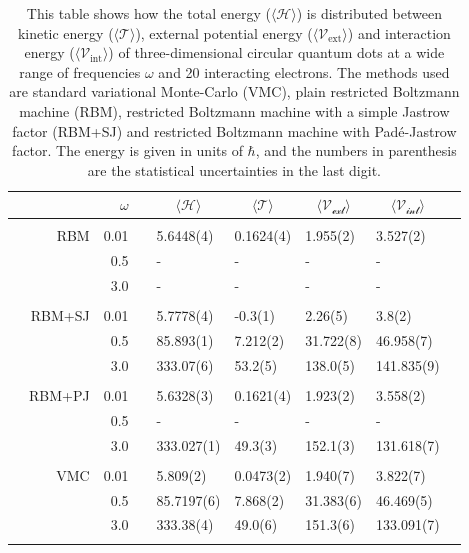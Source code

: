 \begin{table}
	\caption{This table shows how the total energy ($\langle\mathcal{H}\rangle$) is distributed between kinetic energy ($\langle\mathcal{T}\rangle$), external potential energy ($\langle\mathcal{V}_{\text{ext}}\rangle$) and interaction energy ($\langle\mathcal{V}_{\text{int}}\rangle$) of three-dimensional circular quantum dots at a wide range of frequencies $\omega$ and 20 interacting electrons. The methods used are standard variational Monte-Carlo (VMC), plain restricted Boltzmann machine (RBM), restricted Boltzmann machine with a simple Jastrow factor (RBM+SJ) and restricted Boltzmann machine with Padé-Jastrow factor. The energy is given in units of $\hbar$, and the numbers in parenthesis are the statistical uncertainties in the last digit.}
	\label{tab:splitfrequencyQD3D20P}
	\begin{tabularx}{\textwidth}{R{1cm}rrcR{2.3cm}R{2.3cm}R{2.3cm}R{2.3cm}R{0.3cm}} \hline\hline
		&\makecell{\\ \phantom{$N$} \\ \phantom{=}} & $\omega$ &&  &  &  &  \\ \hline \\
		&RBM & 0.01 && 5.6448(4) & 0.1624(4) & 1.955(2) & 3.527(2) \\
		&& 0.5 && - & - & - & - \\
		&& 3.0 && - & - & - & - \\ \hdashline \\
		
		&RBM+SJ & 0.01 && 5.7778(4) & -0.3(1) & 2.26(5) & 3.8(2) \\
		&& 0.5 && 85.893(1) & 7.212(2) & 31.722(8) & 46.958(7) \\
		&& 3.0 && 333.07(6) & 53.2(5) & 138.0(5) & 141.835(9) \\ \hdashline \\
		
		&RBM+PJ & 0.01 && 5.6328(3) & 0.1621(4) & 1.923(2) & 3.558(2) \\
		&& 0.5 && - & - & - & - \\
		&& 3.0 && 333.027(1) & 49.3(3) & 152.1(3) & 131.618(7) \\ \hdashline \\
		
		&VMC & 0.01 && 5.809(2) & 0.0473(2) & 1.940(7) & 3.822(7) \\
		&& 0.5 && 85.7197(6) & 7.868(2) & 31.383(6) & 46.469(5) \\
		&& 3.0 && 333.38(4) & 49.0(6) & 151.3(6) & 133.091(7) \\ \hdashline \\
	\end{tabularx}
\end{table} 


